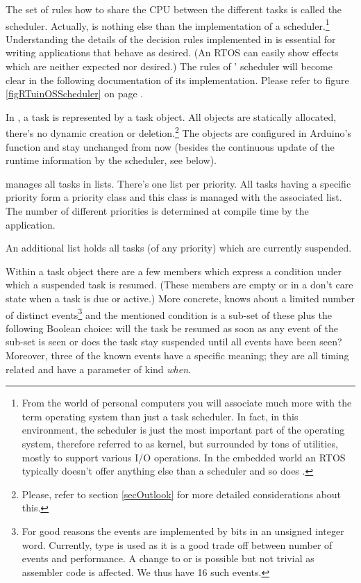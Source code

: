 The set of rules how to share the CPU between the different tasks is
called the scheduler. Actually, \rtos{} is nothing else than the
implementation of a scheduler.\footnote{From the world of personal
computers you will associate much more with the term operating system than
just a task scheduler. In fact, in this environment, the scheduler is just
the most important part of the operating system, therefore referred to as
kernel, but surrounded by tons of utilities, mostly to support various
I/O operations. In the embedded world an RTOS typically doesn't offer
anything else than a scheduler and so does \rtos{}.} Understanding the
details of the decision rules implemented in \rtos{} is essential for
writing applications that behave as desired. (An RTOS can easily show
effects which are neither expected nor desired.) The rules of \rtos'
scheduler will become clear in the following documentation of its
implementation. Please refer to figure \ref{figRTuinOSScheduler} on page
\pageref{figRTuinOSScheduler}.

In \rtos{}, a task is represented by a task object. All objects are
statically allocated, there's no dynamic creation or
deletion.\footnote{Please, refer to section \ref{secOutlook} for more
detailed considerations about this.} The objects are configured in
Arduino's function  and stay unchanged from now (besides the
continuous update of the runtime information by the scheduler, see below).

\rtos{} manages all tasks in lists. There's one list per priority. All
tasks having a specific priority form a priority class and this class is
managed with the associated list. The number of different priorities is
determined at compile time by the application.

An additional list holds all tasks (of any priority) which are currently
suspended.

Within a task object there are a few members which express a condition
under which a suspended task is resumed. (These members are empty or in a
don't care state when a task is due or active.) More concrete, \rtos{}
knows about a limited number of distinct events\footnote{For good reasons
the events are implemented by bits in an unsigned integer word. Currently,
type  is used as it is a good trade off between number
of events and performance. A change to  or
 is possible but not trivial as assembler code is
affected. We thus have 16 such events.} and the mentioned condition is a
sub-set of these plus the following Boolean choice: will the task be
resumed as soon as any event of the sub-set is seen or does the task stay
suspended until all events have been seen? Moreover, three of the known
events have a specific meaning; they are all timing related and have a
parameter of kind \emph{when}.

